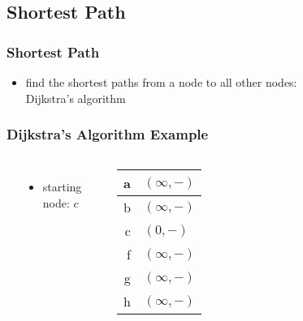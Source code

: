 \documentclass[dvipsnames]{beamer}
\begin{document}
\subsection{Shortest Path}

\begin{frame}
  \frametitle{Shortest Path}

  \begin{itemize}
    \item find the shortest paths from a node to all other nodes:\\
      Dijkstra's algorithm
  \end{itemize}
\end{frame}

\begin{frame}
  \frametitle{Dijkstra's Algorithm Example}

  \begin{example}[initialization]
    \begin{columns}
      \begin{center}
      \end{center}

      \begin{itemize}
        \item starting node: $c$
      \end{itemize}

      \begin{table}
        \begin{tabular}{r|l}
          a & $(\infty,-)$ \\\hline
          b & $(\infty,-)$ \\\hline
          c & $(0,-)$      \\\hline
          f & $(\infty,-)$ \\\hline
          g & $(\infty,-)$ \\\hline
          h & $(\infty,-)$
        \end{tabular}
      \end{table}
    \end{columns}
  \end{example}
\end{frame}
\end{document}
